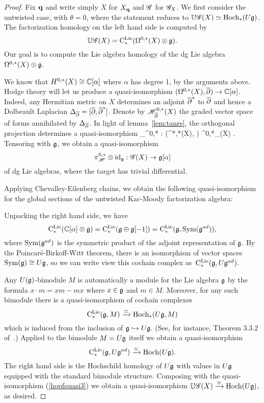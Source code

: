 \begin{proof}
Fix ${\bf q}$ and write simply $X$ for $X_{\bf q}$ and $\mathscr G$ for $\mathscr G_X$. 
We first consider the untwisted case, with $\theta = 0$, where the statement reduces to $\mathbb U\mathscr G(X) \simeq {\rm Hoch}_*(U \mathfrak g)$.
The factorization homology on the left hand side is computed by
\[
\mathbb U \mathscr G (X) = {\rm C}^{\rm Lie}_*(\Omega^{0,*}(X) \otimes \mathfrak g) .
\]
Our goal is to compute the Lie algebra homology of the dg Lie algebra $\Omega^{0,*}(X) \otimes \mathfrak g$.  

We know that $H^{0,*}(X) \cong \mathbb C[\alpha]$ where $\alpha$ has degree 1, by the arguments above.
Hodge theory will let us produce a quasi-isomorphism $(\Omega^{0,*}(X), \overline{\partial}) \to \mathbb C[\alpha]$.
Indeed, any Hermitian metric on $X$ determines an adjoint $\overline{\partial}^*$ to $\overline{\partial}$ and hence a Dolbeault Laplacian $\Delta_{\overline{\partial}} = [\overline{\partial},\overline{\partial}^*]$.
Denote by $\mathscr H^{0,*}_{\overline{\partial}}(X)$ the graded vector space of forms annihilated by $\Delta_{\overline{\partial}}$. 
In light of lemma~\ref{lem:tanre}, the orthogonal projection determines a quasi-isomorphism
\beqn\label{hopfquasi}
\pi_{\sH}^{0,*} : \left(\Omega^{*,*}(X), \dbar \right) \xto{\simeq} \sH^{0,*}_{\dbar}(X) \cong \CC[\alpha].
\eeqn
Tensoring with $\mathfrak g$, we obtain a quasi-isomorphism 
\[
\pi_{\mathscr H}^{0,*} \otimes {\rm id}_\mathfrak g :\mathscr G (X) \to \mathfrak g[\alpha]
\]
of dg Lie algebras, where the target has trivial differential.



Applying Chevalley-Eilenberg chains, we obtain the following quasi-isomorphism for the global sections of the untwisted Kac-Moody factorization algebra:
\beqn\label{hopfquasi3}
\eeqn
Unpacking the right hand side, we have
\[
{\rm C}^{\rm Lie}_*(\mathbb C[\alpha] \otimes \mathfrak g) = {\rm C}^{\rm Lie}_*(\mathfrak g \oplus \mathfrak g[-1]) = {\rm C}^{\rm Lie}_*(\mathfrak g, {\rm Sym} (\mathfrak g^{ad})),
\] 
where ${\rm Sym}(\mathfrak g^{ad})$ is the symmetric product of the adjoint representation of $\mathfrak g$. 
By the Poincar\'{e}-Birkoff-Witt theorem, there is an isomorphism of vector spaces ${\rm Sym}(\mathfrak g) \cong U \mathfrak g$, so we can write view this cochain complex as~${\rm C}^{\rm Lie}_*(\mathfrak g, U \mathfrak g^{ad})$.

Any $U(\mathfrak g)$-bimodule $M$ is automatically a module for the Lie algebra $\mathfrak g$ by the formula $x \cdot m = xm - mx$ where $x \in \mathfrak g$ and $m \in M$.
Moreover, for any such bimodule there is a quasi-isomorphism of cochain complexes 
\[
{\rm C}^{\rm Lie}_*(\mathfrak g, M) \xrightarrow{\simeq} {\rm Hoch}_*(U\mathfrak g, M) 
\]
which is induced from the inclusion of $\mathfrak g \hookrightarrow U \mathfrak g$. 
(See, for instance, Theorem 3.3.2 of~\cite{LodayCyclic}.)
Applied to the bimodule $M = U\mathfrak g$ itself we obtain a quasi-isomorphism 
\[
{\rm C}^{\rm Lie}_*(\mathfrak g , U\mathfrak g^{ad}) \xrightarrow{\simeq} {\rm Hoch}(U\mathfrak g).
\]
The right hand side is the Hochschild homology of $U\mathfrak g$ with values in $U\mathfrak g$ equipped with the standard bimodule structure. 
Composing with the quasi-isomorphism (\ref{hopfquasi3}) we obtain a quasi-isomorphism $\mathbb U\mathscr G(X) \xrightarrow{\simeq} {\rm Hoch}(U\mathfrak g)$, as desired.


\end{proof}
